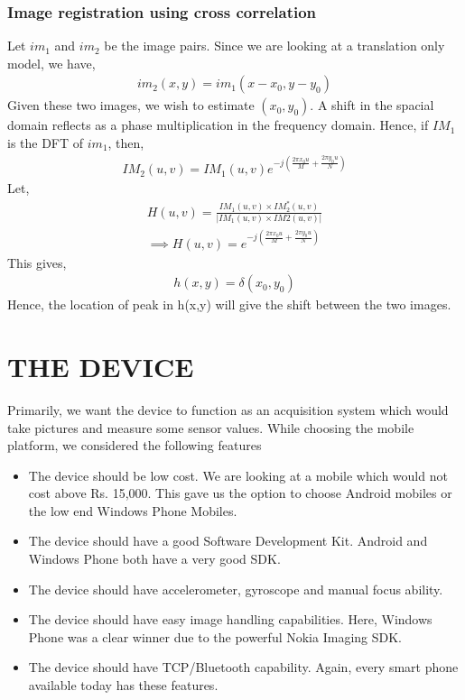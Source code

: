 \documentclass[BTech]{iitmdiss}
\begin{document}
\subsection{Image registration using cross correlation}
Let $im_1$ and $im_2$ be the image pairs. Since we are looking at a 
translation only model, we have,
\begin{align}
im_2(x,y)=im_1(x-x_0, y-y_0)
\end{align}
Given these two images, we wish to estimate $(x_0,y_0)$. A shift in the
spacial domain reflects as a phase multiplication in the frequency domain.
Hence, if $IM_1$ is the DFT of $im_1$, then,
\begin{align}
IM_2(u,v) = IM_1(u,v)e^{-j(\frac{2{\pi}x_0u}{M}+\frac{2{\pi}y_0u}{N})}
\end{align}
Let,
\begin{align}
H(u,v) = \frac{IM_1(u,v){\times}IM_2^*(u,v)}{|IM_1(u,v){\times}IM2(u,v)|}\\
\implies H(u,v) = e^{-j(\frac{2{\pi}x_0u}{M}+\frac{2{\pi}y_0u}{N})}
\end{align}
This gives,
\begin{align}
h(x,y) = \delta(x_0, y_0)
\end{align}
Hence, the location of peak in h(x,y) will give the shift between the 
two images. 

\pagebreak
\chapter{THE DEVICE}
\label{chap:device}
Primarily, we want the device to function as an acquisition system which
would take pictures and measure some sensor values. While choosing the
mobile platform, we considered the following features
\begin{itemize}
\item The device should be low cost. We are looking at a mobile which
would not cost above Rs. 15,000. This gave us the option to choose 
Android mobiles or the low end Windows Phone Mobiles.
\item The device should have a good Software Development Kit. Android
and Windows Phone both have a very good SDK.
\item The device should have accelerometer, gyroscope and manual focus
ability. 
\item The device should have easy image handling capabilities. Here, 
Windows Phone was a clear winner due to the powerful Nokia Imaging SDK.
\item The device should have TCP/Bluetooth capability. Again, every 
smart phone available today has these features. 
\end{itemize}
 
\end{document}
